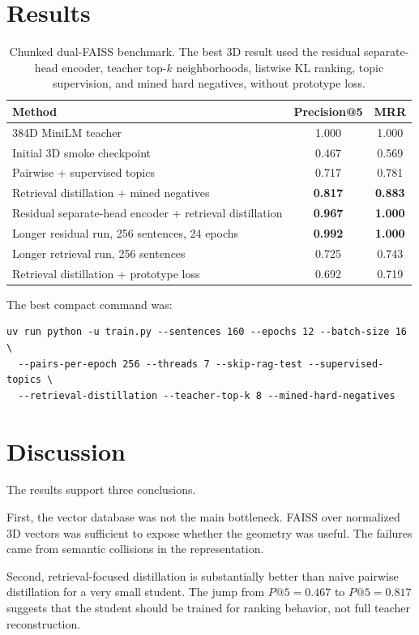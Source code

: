 \documentclass[11pt]{article}
\begin{document}
\section{Results}
\begin{table}[h]
\centering
\begin{tabular}{lcc}
\toprule
Method & Precision@5 & MRR \\
\midrule
384D MiniLM teacher & 1.000 & 1.000 \\
Initial 3D smoke checkpoint & 0.467 & 0.569 \\
Pairwise + supervised topics & 0.717 & 0.781 \\
Retrieval distillation + mined negatives & \textbf{0.817} & \textbf{0.883} \\
Residual separate-head encoder + retrieval distillation & \textbf{0.967} & \textbf{1.000} \\
Longer residual run, 256 sentences, 24 epochs & \textbf{0.992} & \textbf{1.000} \\
Longer retrieval run, 256 sentences & 0.725 & 0.743 \\
Retrieval distillation + prototype loss & 0.692 & 0.719 \\
\bottomrule
\end{tabular}
\caption{Chunked dual-FAISS benchmark. The best 3D result used the residual separate-head encoder, teacher top-$k$ neighborhoods, listwise KL ranking, topic supervision, and mined hard negatives, without prototype loss.}
\end{table}

The best compact command was:
\begin{verbatim}
uv run python -u train.py --sentences 160 --epochs 12 --batch-size 16 \
  --pairs-per-epoch 256 --threads 7 --skip-rag-test --supervised-topics \
  --retrieval-distillation --teacher-top-k 8 --mined-hard-negatives
\end{verbatim}

\section{Discussion}
The results support three conclusions.

First, the vector database was not the main bottleneck. FAISS over normalized 3D vectors was sufficient to expose whether the geometry was useful. The failures came from semantic collisions in the representation.

Second, retrieval-focused distillation is substantially better than naive pairwise distillation for a very small student. The jump from $P@5=0.467$ to $P@5=0.817$ suggests that the student should be trained for ranking behavior, not full teacher reconstruction.
\end{document}
